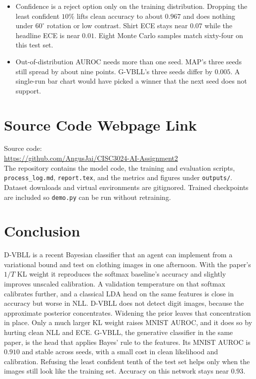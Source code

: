 \documentclass[11pt,a4paper]{article}
\begin{document}
\begin{itemize}
  \item Confidence is a reject option only on the training distribution. Dropping the least confident $10\%$ lifts clean accuracy to about $0.967$ and does nothing under $60^{\circ}$ rotation or low contrast. Shirt ECE stays near $0.07$ while the headline ECE is near $0.01$. Eight Monte Carlo samples match sixty-four on this test set.
  \item Out-of-distribution AUROC needs more than one seed. MAP's three seeds still spread by about nine points. G-VBLL's three seeds differ by $0.005$. A single-run bar chart would have picked a winner that the next seed does not support.
\end{itemize}

\section{Source Code Webpage Link}
Source code:\\[0.3em]
\url{https://github.com/AngusJai/CISC3024-AI-Assignment2}\\[0.3em]
The repository contains the model code, the training and evaluation scripts, \texttt{process\_log.md}, \texttt{report.tex}, and the metrics and figures under \texttt{outputs/}.
Dataset downloads and virtual environments are gitignored.
Trained checkpoints are included so \texttt{demo.py} can be run without retraining.

\section{Conclusion}
D-VBLL is a recent Bayesian classifier that an agent can implement from a variational bound and test on clothing images in one afternoon.
With the paper's $1/T$ KL weight it reproduces the softmax baseline's accuracy and slightly improves unscaled calibration.
A validation temperature on that softmax calibrates further, and a classical LDA head on the same features is close in accuracy but worse in NLL.
D-VBLL does not detect digit images, because the approximate posterior concentrates. Widening the prior leaves that concentration in place. Only a much larger KL weight raises MNIST AUROC, and it does so by hurting clean NLL and ECE.
G-VBLL, the generative classifier in the same paper, is the head that applies Bayes' rule to the features. Its MNIST AUROC is $0.910$ and stable across seeds, with a small cost in clean likelihood and calibration.
Refusing the least confident tenth of the test set helps only when the images still look like the training set. Accuracy on this network stays near $0.93$.
\end{document}

